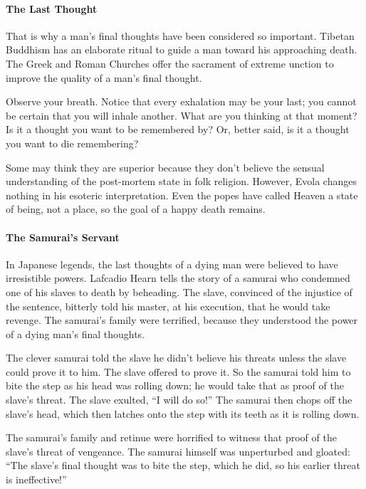 \paragraph{The Last Thought}


That is why a man's final thoughts have been considered so important. Tibetan Buddhism has an elaborate ritual to guide a man toward his approaching death. The Greek and Roman Churches offer the sacrament of extreme unction to improve the quality of a man's final thought.

Observe your breath. Notice that every exhalation may be your last; you cannot be certain that you will inhale another. What are you thinking at that moment? Is it a thought you want to be remembered by? Or, better said, is it a thought you want to die remembering?

Some may think they are superior because they don't believe the sensual understanding of the post-mortem state in folk religion. However, Evola changes nothing in his esoteric interpretation. Even the popes have called Heaven a state of being, not a place, so the goal of a happy death remains.

\paragraph{The Samurai's Servant}


In Japanese legends, the last thoughts of a dying man were believed to have irresistible powers. Lafcadio Hearn tells the story of a samurai who condemned one of his slaves to death by beheading. The slave, convinced of the injustice of the sentence, bitterly told his master, at his execution, that he would take revenge. The samurai's family were terrified, because they understood the power of a dying man's final thoughts.

The clever samurai told the slave he didn't believe his threats unless the slave could prove it to him. The slave offered to prove it. So the samurai told him to bite the step as his head was rolling down; he would take that as proof of the slave's threat. The slave exulted, ``I will do so!'' The samurai then chops off the slave's head, which then latches onto the step with its teeth as it is rolling down.

The samurai's family and retinue were horrified to witness that proof of the slave's threat of vengeance. The samurai himself was unperturbed and gloated: ``The slave's final thought was to bite the step, which he did, so his earlier threat is ineffective!''

